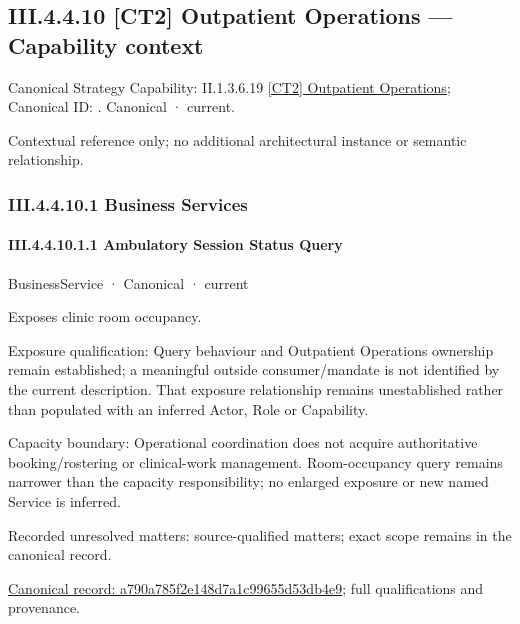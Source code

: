 \subsection*{III.4.4.10 [CT2] Outpatient Operations — Capability context}
\label{navigation:III.4.4.10}

{\small Canonical Strategy Capability: II.1.3.6.19 \hyperref[element:21399d52b9624ddfbeb786f1d72e40c3]{[CT2] Outpatient Operations}; Canonical ID: \texttt{}. Canonical · current.}\par
Contextual reference only; no additional architectural instance or semantic relationship.\par
\subsubsection*{III.4.4.10.1 Business Services}
\label{navigation:III.4.4.10.1}

\paragraph*{III.4.4.10.1.1 Ambulatory Session Status Query}
\label{navigation:III.4.4.10.1.1}

\label{element:a790a785f2e148d7a1c99655d53db4e9}
{\small BusinessService · Canonical · current}\par

Exposes clinic room occupancy.



Exposure qualification: Query behaviour and Outpatient Operations ownership remain established; a meaningful outside consumer/mandate is not identified by the current description. That exposure relationship remains unestablished rather than populated with an inferred Actor, Role or Capability.



Capacity boundary: Operational coordination does not acquire authoritative booking/rostering or clinical-work management. Room-occupancy query remains narrower than the capacity responsibility; no enlarged exposure or new named Service is inferred.


{\small Recorded unresolved matters: source-qualified matters; exact scope remains in the canonical record.}\par
{\footnotesize \href{../../../../../../../continuum/business/business-service/a790a785f2e148d7a1c99655d53db4e9.md}{Canonical record: a790a785f2e148d7a1c99655d53db4e9}; full qualifications and provenance.}\par

